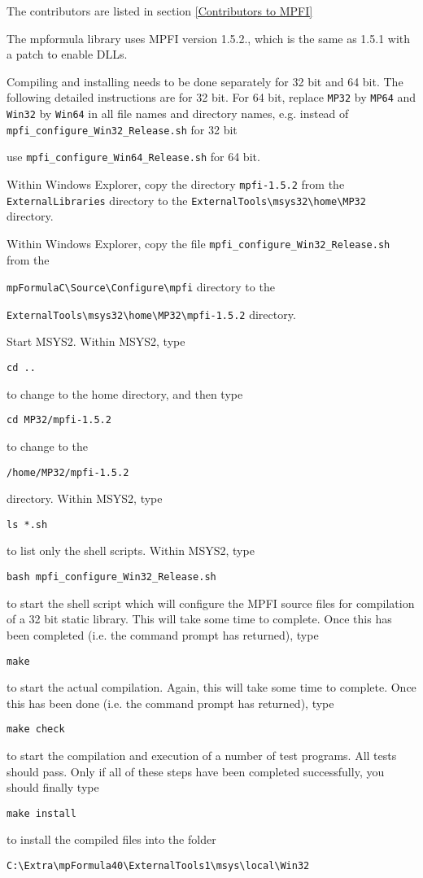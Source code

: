 The contributors are listed in section \ref{Contributors to MPFI}

The mpformula library uses MPFI version 1.5.2., which is the same as 1.5.1 with a patch to enable DLLs.


\vpara
Compiling and installing needs to be done separately for 32 bit and 64 bit. The following detailed instructions are for 32 bit. For 64 bit, replace \verb|MP32| by \verb|MP64| and \verb|Win32| by  \verb|Win64| in all file names and directory names, e.g. instead of \verb|mpfi_configure_Win32_Release.sh| for 32 bit

use \verb|mpfi_configure_Win64_Release.sh| for 64 bit.

\vpara
Within Windows Explorer, copy the directory \verb|mpfi-1.5.2|  from the \verb|ExternalLibraries|
directory to the \verb|ExternalTools\msys32\home\MP32| directory. 

\vpara
Within Windows Explorer, copy the file \verb|mpfi_configure_Win32_Release.sh|  from the

\verb|mpFormulaC\Source\Configure\mpfi| directory to the 

\verb|ExternalTools\msys32\home\MP32\mpfi-1.5.2| directory.  


\vpara
Start MSYS2. Within MSYS2, type
\begin{verbatim}
cd ..
\end{verbatim}
to change to the home directory, and then type 
\begin{verbatim}
cd MP32/mpfi-1.5.2
\end{verbatim}
to change to the
\begin{verbatim}
/home/MP32/mpfi-1.5.2
\end{verbatim}
directory. Within MSYS2, type
\begin{verbatim}
ls *.sh
\end{verbatim}
to list only the shell scripts. Within MSYS2, type
\begin{verbatim}
bash mpfi_configure_Win32_Release.sh
\end{verbatim}
to start the shell script which will configure the MPFI source files for compilation of a 32 bit static library. This will take some time to complete. Once this has been completed (i.e. the command prompt has returned), type
\begin{verbatim}
make
\end{verbatim}
to start the actual compilation. Again, this will take some time to complete. Once this has been done (i.e. the command prompt has returned), type
\begin{verbatim}
make check
\end{verbatim}
to start the compilation and execution of a number of test programs. All tests should pass. Only if all of these steps have been completed successfully, you should finally type
\begin{verbatim}
make install
\end{verbatim}
to install the compiled files into the folder
\begin{verbatim}
C:\Extra\mpFormula40\ExternalTools1\msys\local\Win32
\end{verbatim}



